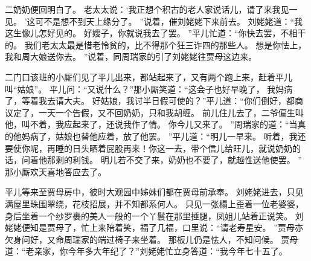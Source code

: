 二奶奶便回明白了。
老太太说：‘我正想个积古的老人家说话儿，请了来我见一见。
’这可不是想不到天上缘分了。
”说着，催刘姥姥下来前去。
刘姥姥道：“我这生像儿怎好见的。
好嫂子，你就说我去了罢。
”平儿忙道：“你快去罢，不相干的。
我们老太太最是惜老怜贫的，比不得那个狂三诈四的那些人。
想是你怯上，我和周大娘送你去。
”说着，同周瑞家的引了刘姥姥往贾母这边来。
\par
二门口该班的小厮们见了平儿出来，都站起来了，又有两个跑上来，赶着平儿叫“姑娘”。
平儿问：“又说什么？”那小厮笑道：“这会子也好早晚了，
我妈病了，等着我去请大夫。
好姑娘，我讨半日假可使的？”平儿道：“你们倒好，都商议定了，一天一个告假，又不回奶奶，只和我胡缠。
前儿住儿去了，二爷偏生叫他，叫不着，我应起来了，还说我作了情。
你今儿又来了。
”周瑞家的道：“当真的他妈病了，姑娘也替他应着，放了他罢。
”平儿道：“明儿一早来。
听着，我还要使你呢，再睡的日头晒着屁股再来！你这一去，带个信儿给旺儿，就说奶奶的话，问着他那剩的利钱。
明儿若不交了来，奶奶也不要了，就越性送他使罢。
”
那小厮欢天喜地答应去了。
\par
平儿等来至贾母房中，彼时大观园中姊妹们都在贾母前承奉。
刘姥姥进去，只见满屋里珠围翠绕，花枝招展，并不知都系何人。
只见一张榻上歪着一位老婆婆，身后坐着一个纱罗裹的美人一般的一个丫鬟在那里捶腿，凤姐儿站着正说笑。
刘姥姥便知是贾母了，忙上来陪着笑，福了几福，口里说：“请老寿星安。
”贾母亦欠身问好，又命周瑞家的端过椅子来坐着。
那板儿仍是怯人，不知问候。
贾母道：“老亲家，你今年多大年纪了？”刘姥姥忙立身答道：“我今年七十五了。
